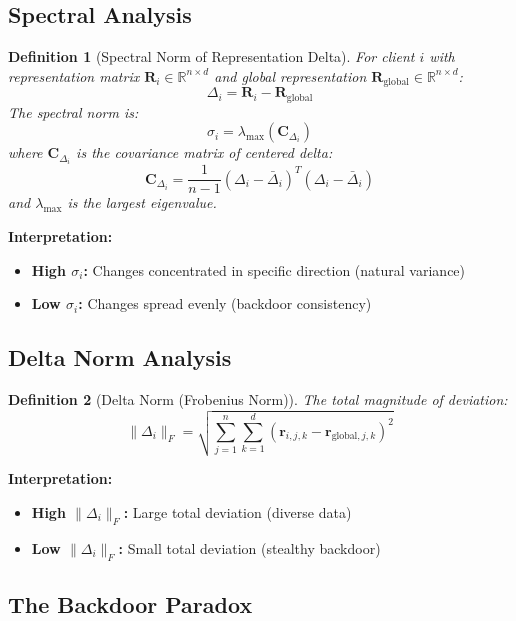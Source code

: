 \documentclass[11pt,a4paper]{article}
\newtheorem{definition}{Definition}
\begin{document}
\subsection{Spectral Analysis}

\begin{definition}[Spectral Norm of Representation Delta]
For client $i$ with representation matrix $\mathbf{R}_i \in \mathbb{R}^{n \times d}$ and global representation $\mathbf{R}_{\text{global}} \in \mathbb{R}^{n \times d}$:
\[
\Delta_i = \mathbf{R}_i - \mathbf{R}_{\text{global}}
\]
The spectral norm is:
\[
\sigma_i = \lambda_{\max}(\mathbf{C}_{\Delta_i})
\]
where $\mathbf{C}_{\Delta_i}$ is the covariance matrix of centered delta:
\[
\mathbf{C}_{\Delta_i} = \frac{1}{n-1}(\Delta_i - \bar{\Delta}_i)^T(\Delta_i - \bar{\Delta}_i)
\]
and $\lambda_{\max}$ is the largest eigenvalue.
\end{definition}

\textbf{Interpretation:}
\begin{itemize}
    \item \textbf{High $\sigma_i$:} Changes concentrated in specific direction (natural variance)
    \item \textbf{Low $\sigma_i$:} Changes spread evenly (backdoor consistency)
\end{itemize}

\subsection{Delta Norm Analysis}

\begin{definition}[Delta Norm (Frobenius Norm)]
The total magnitude of deviation:
\[
\|\Delta_i\|_F = \sqrt{\sum_{j=1}^{n}\sum_{k=1}^{d}(\mathbf{r}_{i,j,k} - \mathbf{r}_{\text{global},j,k})^2}
\]
\end{definition}

\textbf{Interpretation:}
\begin{itemize}
    \item \textbf{High $\|\Delta_i\|_F$:} Large total deviation (diverse data)
    \item \textbf{Low $\|\Delta_i\|_F$:} Small total deviation (stealthy backdoor)
\end{itemize}

\subsection{The Backdoor Paradox}
\end{document}
